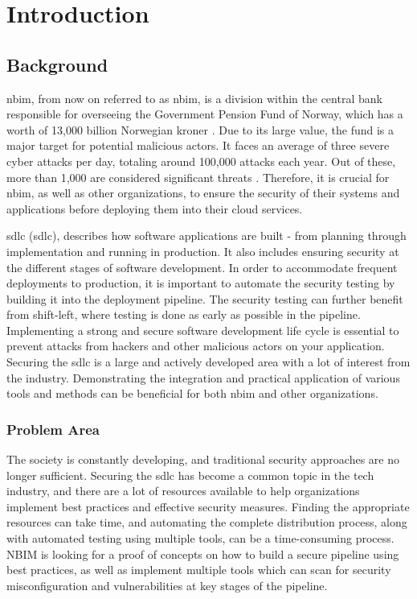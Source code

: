 \chapter{Introduction}

\section{Background} %
\acrlong{nbim}, from now on referred to as \acrshort{nbim}, is a division within the central bank responsible for overseeing the Government Pension Fund of Norway, which has a worth of 13,000 billion Norwegian kroner \cite{nbimwebsite}. Due to its large value, the fund is a major target for potential malicious actors. It faces an average of three severe cyber attacks per day, totaling around 100,000 attacks each year. Out of these, more than 1,000 are considered significant threats \cite{nbimattacks}. Therefore, it is crucial for \acrshort{nbim}, as well as other organizations, to ensure the security of their systems and applications before deploying them into their cloud services. 

\acrlong{sdlc} (\acrshort{sdlc}), describes how software applications are built - from planning through implementation and running in production. It also includes ensuring security at the different stages of software development. In order to accommodate frequent deployments to production, it is important to automate the security testing by building it into the deployment pipeline. The security testing can further benefit from shift-left, where testing is done as early as possible in the pipeline. Implementing a strong and secure software development life cycle is essential to prevent attacks from hackers and other malicious actors on your application. Securing the \acrshort{sdlc} is a large and actively developed area with a lot of interest from the industry. Demonstrating the integration and practical application of various tools and methods can be beneficial for both \acrshort{nbim} and other organizations.

\subsection{Problem Area}
The society is constantly developing, and traditional security approaches are no longer sufficient. Securing the \acrlong{sdlc} has become a common topic in the tech industry, and there are a lot of resources available to help organizations implement best practices and effective security measures. Finding the appropriate resources can take time, and automating the complete distribution process, along with automated testing using multiple tools, can be a time-consuming process. NBIM is looking for a proof of concepts on how to build a secure pipeline using best practices, as well as implement multiple tools which can scan for security misconfiguration and vulnerabilities at key stages of the pipeline. 

